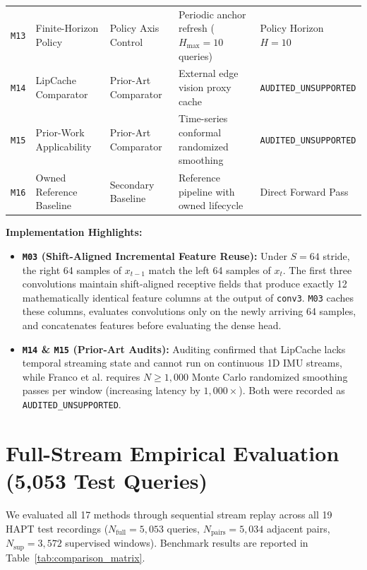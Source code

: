 \documentclass[journal,onecolumn,10pt]{IEEEtran}
\newcommand{\code}[1]{{\small\ttfamily\nolinkurl{#1}}}
\theoremstyle{remark}
\begin{document}
\begin{table}[!htbp]
{\begin{tabular}{@{}llP{2.6cm}P{4.2cm}l@{}}
\code{M13} & Finite-Horizon Policy & Policy Axis Control & Periodic anchor refresh ($H_{\max} = 10$ queries) & Policy Horizon $H = 10$ \\
\code{M14} & LipCache Comparator & Prior-Art Comparator & External edge vision proxy cache \cite{xiang2026lipcache} & \code{AUDITED\_UNSUPPORTED} \\
\code{M15} & Prior-Work Applicability & Prior-Art Comparator & Time-series conformal randomized smoothing \cite{franco2024conformalized} & \code{AUDITED\_UNSUPPORTED} \\
\code{M16} & Owned Reference Baseline & Secondary Baseline & Reference pipeline with owned lifecycle & Direct Forward Pass \\
\bottomrule
\end{tabular}%
}
\end{table}

\textbf{Implementation Highlights:}
\begin{itemize}[leftmargin=1.4em]
  \item \textbf{\code{M03} (Shift-Aligned Incremental Feature Reuse):} Under $S=64$ stride, the right 64 samples of $x_{t-1}$ match the left 64 samples of $x_t$. The first three convolutions maintain shift-aligned receptive fields that produce exactly 12 mathematically identical feature columns at the output of \code{conv3}. \code{M03} caches these columns, evaluates convolutions only on the newly arriving 64 samples, and concatenates features before evaluating the dense head.
  \item \textbf{\code{M14} \& \code{M15} (Prior-Art Audits):} Auditing confirmed that LipCache \cite{xiang2026lipcache} lacks temporal streaming state and cannot run on continuous 1D IMU streams, while Franco et al. \cite{franco2024conformalized} requires $N \ge 1,000$ Monte Carlo randomized smoothing passes per window (increasing latency by $1,000\times$). Both were recorded as \code{AUDITED_UNSUPPORTED}.
\end{itemize}

\section{Full-Stream Empirical Evaluation (5,053 Test Queries)}
We evaluated all 17 methods through sequential stream replay across all 19 HAPT test recordings ($N_{\text{full}} = 5,053$ queries, $N_{\text{pairs}} = 5,034$ adjacent pairs, $N_{\text{sup}} = 3,572$ supervised windows). Benchmark results are reported in Table~\ref{tab:comparison_matrix}.
\end{document}
